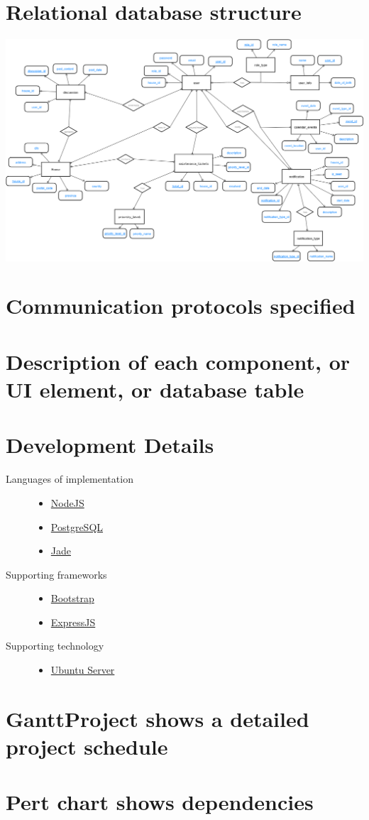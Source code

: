 \documentclass[12pt]{article}
\begin{document}
\section{Relational database structure}
\includegraphics[scale=0.397, angle=-90, keepaspectratio]{images/ER_Diagram.png}
%
\section{Communication protocols specified}

%
\section{Description of each component, or UI element, or database table}

%
\section{Development Details}
\begin{description}
  \item[Languages of implementation] \hfill
    \begin{itemize}
      \item \href{https://nodejs.org/en/}{NodeJS}
      \item \href{http://www.postgresql.org/}{PostgreSQL}
      \item \href{http://jade-lang.com/}{Jade}
    \end{itemize}
  \item[Supporting frameworks] \hfill
    \begin{itemize}
      \item \href{http://getbootstrap.com/}{Bootstrap}
      \item \href{http://expressjs.com/}{ExpressJS}
    \end{itemize}
  \item[Supporting technology] \hfill
    \begin{itemize}
      \item \href{http://www.ubuntu.com/server}{Ubuntu Server}
    \end{itemize}
\end{description}
%
\section{GanttProject shows a detailed project schedule}

%
\section{Pert chart shows dependencies}
\end{document}
